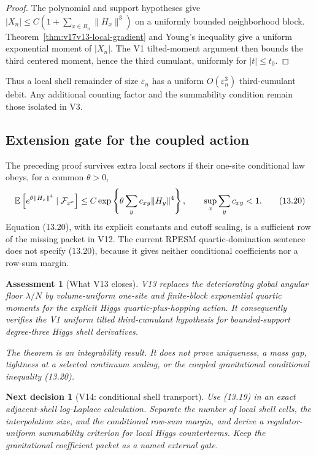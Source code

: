\documentclass[11pt]{article}
\newtheorem{decision}[theorem]{Next decision}
\newtheorem{assessment}[theorem]{Assessment}
\theoremstyle{remark}
\begin{document}
\begin{proof}
The polynomial and support hypotheses give
\(|X_n|\leq C(1+\sum_{x\in B_n}\|H_x\|^3)\) on a uniformly bounded
neighborhood block.  Theorem~\ref{thm:v17v13-local-gradient} and
Young's inequality give a uniform exponential moment of
\(|X_n|\).  The V1 tilted-moment argument then bounds the third
centered moment, hence the third cumulant, uniformly for
\(|t|\leq t_0\).
\end{proof}

Thus a local shell remainder of size \(\varepsilon_n\) has a
uniform \(O(\varepsilon_n^3)\) third-cumulant debit.  Any additional
counting factor and the summability condition remain those isolated
in V3.

\subsection{Extension gate for the coupled action}

The preceding proof survives extra local sectors if their
one-site conditional law obeys, for a common \(\theta>0\),
\[
 \mathbb E\left[e^{\theta\|H_x\|^4}\mid{\cal F}_{x^c}\right]
 \leq C
 \exp\left\{\theta\sum_yc_{xy}\|H_y\|^4\right\},
 \qquad
 \sup_x\sum_yc_{xy}<1.                             \tag{13.20}
\]
Equation (13.20), with its explicit constants and cutoff scaling,
is a sufficient row of the missing packet in V12.  The current
RPESM quartic-domination sentence does not specify (13.20), because
it gives neither conditional coefficients nor a row-sum margin.

\begin{assessment}[What V13 closes]
\label{ass:v17v13-status}
V13 replaces the deteriorating global angular floor
\(\lambda/N\) by volume-uniform one-site and finite-block
exponential quartic moments for the explicit Higgs
quartic-plus-hopping action.  It consequently verifies the V1
uniform tilted third-cumulant hypothesis for bounded-support
degree-three Higgs shell derivatives.

The theorem is an integrability result.  It does not prove
uniqueness, a mass gap, tightness at a selected continuum scaling,
or the coupled gravitational conditional inequality (13.20).
\end{assessment}

\begin{decision}[V14: conditional shell transport]
\label{dec:v17v13-next}
Use (13.19) in an exact adjacent-shell log-Laplace calculation.
Separate the number of local shell cells, the interpolation size,
and the conditional row-sum margin, and derive a regulator-uniform
summability criterion for local Higgs counterterms.  Keep the
gravitational coefficient packet as a named external gate.
\end{decision}
\end{document}
